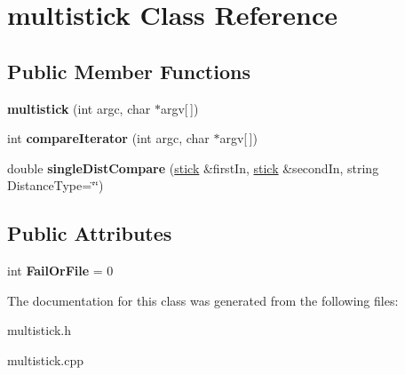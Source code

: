 \hypertarget{classmultistick}{}\section{multistick Class Reference}
\label{classmultistick}
\subsection*{Public Member Functions}
\begin{DoxyCompactItemize}
\item 
\hypertarget{classmultistick_a4bfbe6bd128d5e4bd4ec33c4e14fb73e}{}{\bfseries multistick} (int argc, char $\ast$argv\mbox{[}$\,$\mbox{]})\label{classmultistick_a4bfbe6bd128d5e4bd4ec33c4e14fb73e}

\item 
\hypertarget{classmultistick_ab8a142970ffd5cee6f0ac1f13952dc16}{}int {\bfseries compare\+Iterator} (int argc, char $\ast$argv\mbox{[}$\,$\mbox{]})\label{classmultistick_ab8a142970ffd5cee6f0ac1f13952dc16}

\item 
\hypertarget{classmultistick_a8b89a7b3ceea3192091c01328569ac31}{}double {\bfseries single\+Dist\+Compare} (\hyperlink{classstick}{stick} \&first\+In, \hyperlink{classstick}{stick} \&second\+In, string Distance\+Type=\char`\"{}\char`\"{})\label{classmultistick_a8b89a7b3ceea3192091c01328569ac31}

\end{DoxyCompactItemize}
\subsection*{Public Attributes}
\begin{DoxyCompactItemize}
\item 
\hypertarget{classmultistick_ab15d9871a00ad249856eb4ca90193d7c}{}int {\bfseries Fail\+Or\+File} = 0\label{classmultistick_ab15d9871a00ad249856eb4ca90193d7c}

\end{DoxyCompactItemize}


The documentation for this class was generated from the following files\+:\begin{DoxyCompactItemize}
\item 
multistick.\+h\item 
multistick.\+cpp\end{DoxyCompactItemize}

